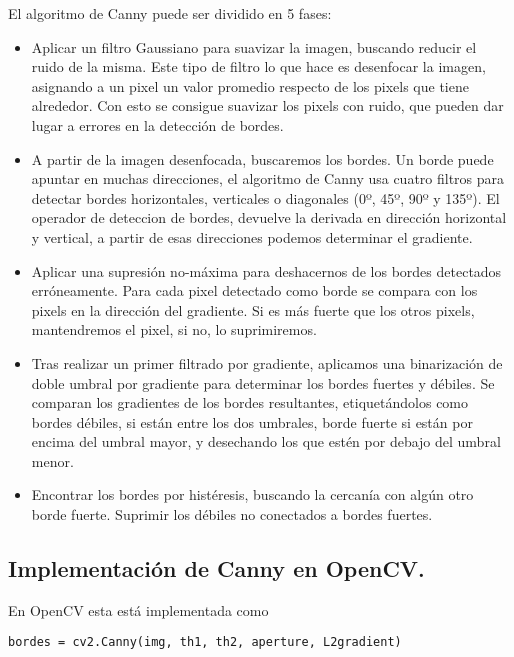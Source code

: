 El algoritmo de Canny puede ser dividido en 5 fases:
\begin{itemize}

	\item Aplicar un filtro Gaussiano para suavizar la imagen, buscando reducir el ruido de la misma. Este tipo de filtro lo que hace es desenfocar la imagen, asignando a un pixel un valor promedio respecto de los pixels que tiene alrededor. Con esto se consigue suavizar los pixels con ruido, que pueden dar lugar a errores en la detección de bordes.
	
	\item A partir de la imagen desenfocada, buscaremos los bordes. Un borde puede apuntar en muchas direcciones, el algoritmo de Canny usa cuatro filtros para detectar bordes horizontales, verticales o diagonales (0º, 45º, 90º y 135º). El operador de deteccion de bordes, devuelve la derivada en dirección horizontal y vertical, a partir de esas direcciones podemos determinar el gradiente.
	
	\item Aplicar una supresión no-máxima para deshacernos de los bordes detectados erróneamente. Para cada pixel detectado como borde se compara con los pixels en la dirección del gradiente. Si es más fuerte que los otros pixels, mantendremos el pixel, si no, lo suprimiremos.
	
	\item Tras realizar un primer filtrado por gradiente, aplicamos una binarización de doble umbral por gradiente para determinar los bordes fuertes y débiles. Se comparan los gradientes de los bordes resultantes, etiquetándolos como bordes débiles, si están entre los dos umbrales, borde fuerte si están por encima del umbral mayor, y desechando los que estén por debajo del umbral menor.
	
	\item Encontrar los bordes por histéresis, buscando  la cercanía con algún otro borde fuerte. Suprimir los débiles no conectados a bordes fuertes.
	
\end{itemize}

\subsection{Implementación de Canny en OpenCV.}

En OpenCV esta está implementada como\cite{canny_doc}

\begin{verbatim}
bordes = cv2.Canny(img, th1, th2, aperture, L2gradient)
\end{verbatim}

